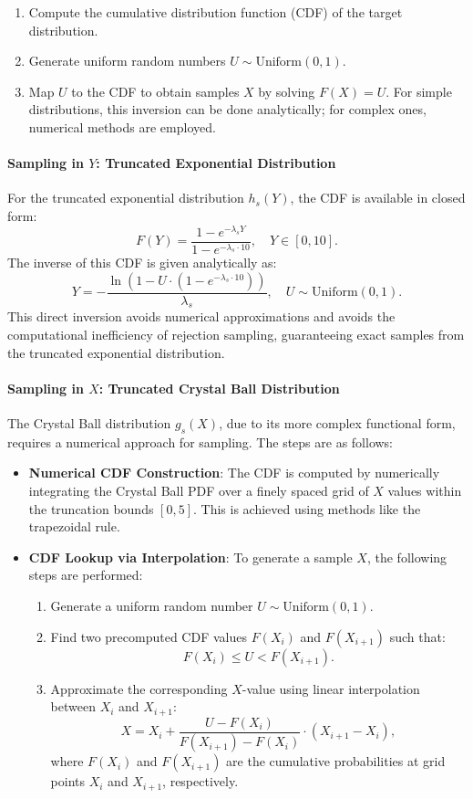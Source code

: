 \documentclass[11pt, a4paper]{article}
\begin{document}
\begin{enumerate}
    \item Compute the cumulative distribution function (CDF) of the target distribution.
    \item Generate uniform random numbers \( U \sim \text{Uniform}(0, 1) \).
    \item Map \( U \) to the CDF to obtain samples \( X \) by solving \( F(X) = U \). 
          For simple distributions, this inversion can be done analytically; for complex ones, numerical methods are employed.
\end{enumerate}

\paragraph{Sampling in \( Y \): Truncated Exponential Distribution}
For the truncated exponential distribution \( h_s(Y) \), the CDF is available in closed form:
\[
F(Y) = \frac{1 - e^{-\lambda_s Y}}{1 - e^{-\lambda_s \cdot 10}}, \quad Y \in [0, 10].
\]
The inverse of this CDF is given analytically as:
\[
Y = -\frac{\ln(1 - U \cdot (1 - e^{-\lambda_s \cdot 10}))}{\lambda_s}, \quad U \sim \text{Uniform}(0, 1).
\]
This direct inversion avoids numerical approximations and avoids the computational inefficiency of rejection sampling, guaranteeing exact samples from the truncated exponential distribution.

\paragraph{Sampling in \( X \): Truncated Crystal Ball Distribution}
The Crystal Ball distribution \( g_s(X) \), due to its more complex functional form, requires a numerical approach for sampling. The steps are as follows:
\begin{itemize}
    \item \textbf{Numerical CDF Construction}: The CDF is computed by numerically integrating the Crystal Ball PDF over a finely spaced grid of \( X \) values within the truncation bounds \( [0, 5] \). This is achieved using methods like the trapezoidal rule.
    \item \textbf{CDF Lookup via Interpolation}: To generate a sample \( X \), the following steps are performed:
\begin{enumerate}
    \item Generate a uniform random number \( U \sim \text{Uniform}(0, 1) \).
    \item Find two precomputed CDF values \( F(X_i) \) and \( F(X_{i+1}) \) such that:
    \[
    F(X_i) \leq U < F(X_{i+1}).
    \]
    \item Approximate the corresponding \( X \)-value using linear interpolation between \( X_i \) and \( X_{i+1} \):
    \[
    X = X_i + \frac{U - F(X_i)}{F(X_{i+1}) - F(X_i)} \cdot (X_{i+1} - X_i),
    \]
    where \( F(X_i) \) and \( F(X_{i+1}) \) are the cumulative probabilities at grid points \( X_i \) and \( X_{i+1} \), respectively.
\end{enumerate}

\end{itemize}
\end{document}
